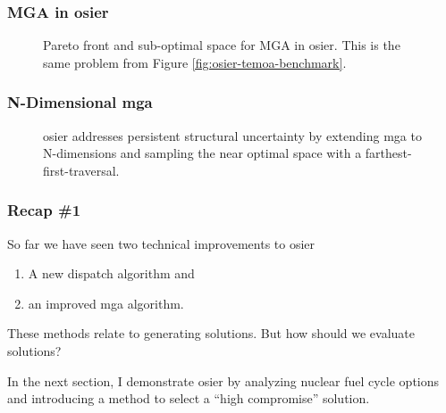 \begin{frame}
    \frametitle{MGA in \gls{osier}}
    \begin{figure}
        \centering
        \resizebox{0.75\columnwidth}{!}{}
        \caption{Pareto front and sub-optimal space for MGA in \gls{osier}. This is the same problem from Figure \ref{fig:osier-temoa-benchmark}.}
    \end{figure}
\end{frame}

\begin{frame}
    \frametitle{N-Dimensional \gls{mga}}
    \begin{figure}
        \centering
        \resizebox{\columnwidth}{!}{}
        \caption{\gls{osier} addresses persistent structural uncertainty by
        extending \gls{mga} to N-dimensions and sampling the near optimal space
        with a farthest-first-traversal.}
    \end{figure}
\end{frame}


\begin{frame}
    \frametitle{Recap \#1}

    So far we have seen two technical improvements to \gls{osier}

    \begin{enumerate}
        \item A new dispatch algorithm and
        \item an improved \gls{mga} algorithm.
    \end{enumerate}

    These methods relate to generating solutions. But how should we evaluate 
    solutions?
    
    In the next section, I demonstrate \gls{osier} by analyzing nuclear fuel cycle options
    and introducing a method to select a ``high compromise'' solution.
\end{frame}